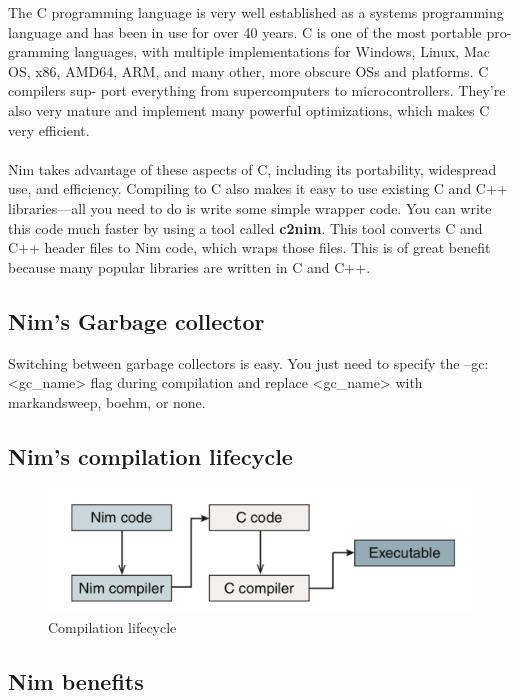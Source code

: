 \documentclass[10pt, a4paper, twocolumn]{article} %
\begin{document}
The C programming language is very well established as a systems programming language and has been in use for over 40 years. C is one of the most portable pro- gramming languages, with multiple implementations for Windows, Linux, Mac OS, x86, AMD64, ARM, and many other, more obscure OSs and platforms. C compilers sup- port everything from supercomputers to microcontrollers. They’re also very mature and implement many powerful optimizations, which makes C very efficient.
\\
\\
Nim takes advantage of these aspects of C, including its portability, widespread use, and efficiency.
Compiling to C also makes it easy to use existing C and C++ libraries—all you need to do is write some simple wrapper code. You can write this code much faster by using a tool called \textbf{c2nim}. This tool converts C and C++ header files to Nim code, which wraps those files. This is of great benefit because many popular libraries are written in C and C++.

\subsection{Nim's Garbage collector} 

Switching between garbage collectors is easy. You just need to specify the --gc:<gc\_name> flag during compilation and replace <gc\_name> with markandsweep, boehm, or none.


\subsection{Nim's compilation lifecycle} 

\begin{figure}[h!]
	\includegraphics[width=0.8\linewidth]{nim_lifecycle.png} %
	\caption{Compilation lifecycle} %
	\label{Nim Compilers} %
\end{figure}

\subsection{Nim benefits} 
\end{document}
